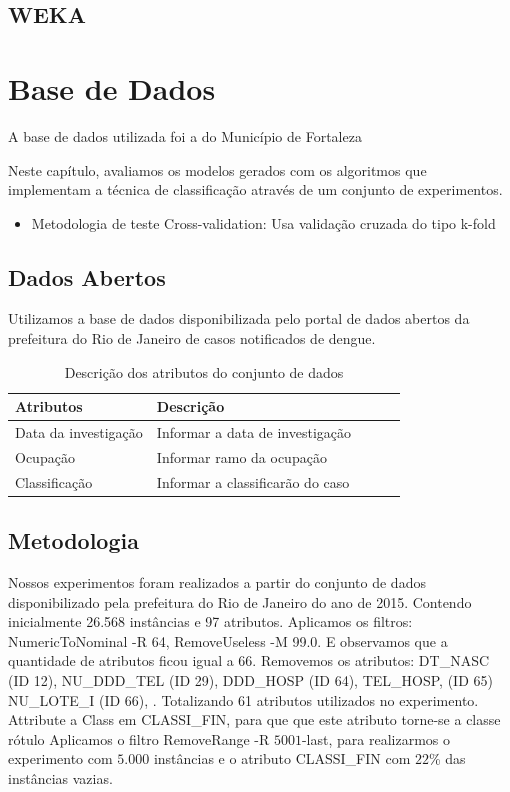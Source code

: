 \documentclass[
	12pt,				%
	openright,			%
	oneside,	
	a4paper,				%
	english,				%
	brazil				%
]{abntex2/abntex2} %
\begin{document}
	\section{WEKA}
\chapter{Base de Dados}

	A base de dados utilizada foi a do Município de Fortaleza
	
	Neste capítulo, avaliamos os modelos gerados com os algoritmos que implementam a técnica de classificação através de um conjunto de experimentos.

	\begin{itemize}
		\item Metodologia de teste Cross-validation: Usa validação cruzada do tipo k-fold
	\end{itemize}

	
	\section{Dados Abertos}
	
	Utilizamos a base de dados disponibilizada pelo portal de dados abertos da prefeitura do Rio de Janeiro de casos notificados de dengue.

		\begin{table}[]
			\caption{Descrição dos atributos do conjunto de dados}
			\label{tabelaDescricaoAtributos}
			\centering
			\label{my-label}
			\begin{tabular}{@{}lllll@{}}
				\toprule
				Atributos            & Descrição                        &  &  &  \\ \midrule
				Data da investigação & Informar a data de investigação  &  &  &  \\
				Ocupação             & Informar ramo da ocupação        &  &  &  \\
				Classificação        & Informar a classificarão do caso &  &  &  \\ \bottomrule
			\end{tabular}
		\end{table}
		
		
	\section{Metodologia}
	
		Nossos experimentos foram realizados a partir do conjunto de dados disponibilizado pela prefeitura do Rio de Janeiro do ano de 2015. Contendo inicialmente 26.568 instâncias e 97 atributos.
		Aplicamos os filtros: NumericToNominal -R 64, RemoveUseless -M 99.0. E observamos que a quantidade de atributos ficou igual a 66.
		Removemos os atributos: DT_NASC (ID 12), NU_DDD_TEL (ID 29), DDD_HOSP (ID 64), TEL_HOSP, (ID 65) NU_LOTE_I (ID 66), . Totalizando 61 atributos utilizados no experimento.
		Attribute a Class em CLASSI_FIN, para que que este atributo torne-se a classe rótulo
		Aplicamos o filtro RemoveRange -R $5001$-last, para realizarmos o experimento com $5.000$ instâncias e o atributo CLASSI_FIN com $22$\% das instâncias vazias.
		
\end{document}
